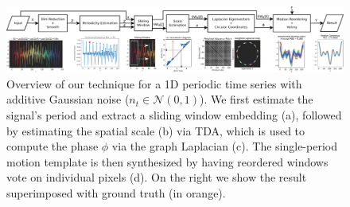 \documentclass{article}
\begin{document}
\begin{figure}[t!]
\centering
\includegraphics[width=\textwidth]{BlockDiagram.pdf}
	\caption{Overview of our technique for a 1D periodic time series with additive Gaussian noise ($n_t \in \mathcal{N}(0, 1)$). We first estimate the signal's period and extract a sliding window embedding (a), followed by estimating the spatial scale (b) via TDA, which is used to compute the phase $\phi$ via the graph Laplacian (c). The single-period motion template is then synthesized by having reordered windows vote on individual pixels (d). On the right we show the result superimposed with ground truth (in orange).}
\label{fig:ConceptFigure}
\end{figure}
\end{document}
